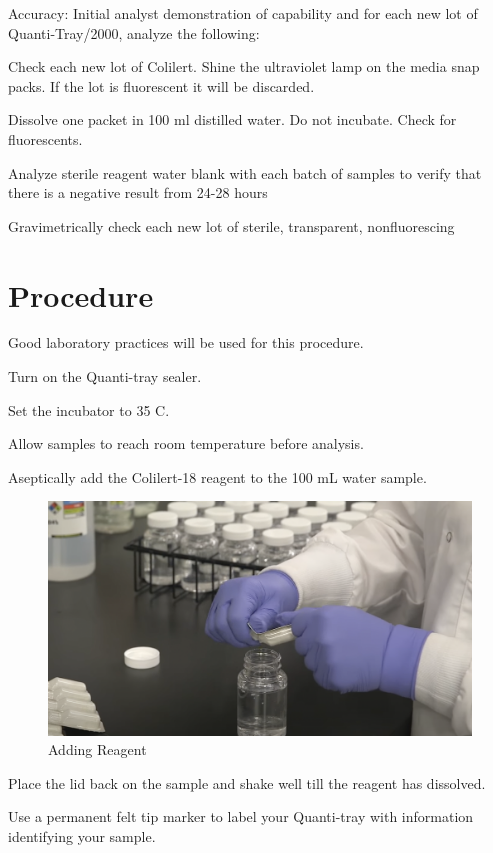 \documentclass[12pt]{../SOP4_alpha}\usepackage[]{graphicx}\usepackage[]{xcolor}
\begin{document}
\NP Accuracy: Initial analyst demonstration of capability and for each new lot of Quanti-Tray/2000, analyze the following:

\NP Check each new lot of Colilert. Shine the ultraviolet lamp on the media snap packs. If the lot is fluorescent it will be discarded.

\NP Dissolve one packet in 100 ml distilled water. Do not incubate.
Check for fluorescents.

\NP Analyze sterile reagent water blank with each batch of samples to
verify that there is a negative result from 24-28 hours

\NP Gravimetrically check each new lot of sterile, transparent, nonfluorescing

\section{Procedure}

Good laboratory practices will be used for this procedure.

\NP Turn on the Quanti-tray sealer. 

\NP Set the incubator to 35 \degree C.

\NP Allow samples to reach room temperature before analysis.

\NP Aseptically add the Colilert-18 reagent to the 100 mL water sample.

\begin{figure}[h]
\includegraphics[width=1.0\textwidth]{figures/AddingReagent.png}
\caption{Adding Reagent}
\label{fig:Adding Reagent}
\end{figure}

\NP Place the lid back on the sample and shake well till the reagent has dissolved.

\NP Use a permanent felt tip marker to label your Quanti-tray with information identifying your sample. 
\end{document}
